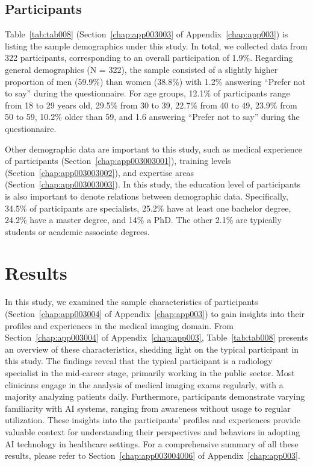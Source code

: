 \subsection{Participants}
\label{sec:chap004004002}

Table~\ref{tab:tab008} (Section~\ref{chap:app003003} of Appendix~\ref{chap:app003}) is listing the sample demographics under this study.
In total, we collected data from 322 participants, corresponding to an overall participation of 1.9\%.
Regarding general demographics (N = 322), the sample consisted of a slightly higher proportion of men (59.9\%) than women (38.8\%) with 1.2\% answering ``Prefer not to say'' during the questionnaire.
For age groups, 12.1\% of participants range from 18 to 29 years old, 29.5\% from 30 to 39, 22.7\% from 40 to 49, 23.9\% from 50 to 59, 10.2\% older than 59, and 1.6 answering ``Prefer not to say'' during the questionnaire.

Other demographic data are important to this study, such as medical experience of participants (Section~\ref{chap:app003003001}), training levels (Section~\ref{chap:app003003002}), and expertise areas (Section~\ref{chap:app003003003}).
In this study, the education level of participants is also important to denote relations between demographic data.
Specifically, 34.5\% of participants are specialists, 25.2\% have at least one bachelor degree, 24.2\% have a master degree, and 14\% a PhD.
The other 2.1\% are typically students or academic associate degrees.

\section{Results}
\label{sec:chap004005}

In this study, we examined the sample characteristics of participants (Section~\ref{chap:app003004} of Appendix~\ref{chap:app003}) to gain insights into their profiles and experiences in the medical imaging domain.
From Section~\ref{chap:app003004} of Appendix~\ref{chap:app003}, Table~\ref{tab:tab008} presents an overview of these characteristics, shedding light on the typical participant in this study.
The findings reveal that the typical participant is a radiology specialist in the mid-career stage, primarily working in the public sector.
Most clinicians engage in the analysis of medical imaging exams regularly, with a majority analyzing patients daily.
Furthermore, participants demonstrate varying familiarity with \ac{AI} systems, ranging from awareness without usage to regular utilization.
These insights into the participants' profiles and experiences provide valuable context for understanding their perspectives and behaviors in adopting \ac{AI} technology in healthcare settings.
For a comprehensive summary of all these results, please refer to Section~\ref{chap:app003004006} of Appendix~\ref{chap:app003}.

